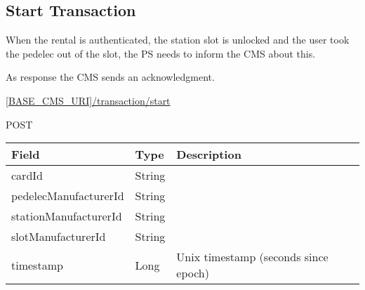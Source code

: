 %
%
%
%
%
%
%
%
%


\subsection{Start Transaction}

When the rental is authenticated, the station slot is unlocked and the user took the pedelec out of the slot, the \acs{PS} needs to inform the \acs{CMS} about this.

As response the \acs{CMS} sends an acknowledgment.

 \url{[BASE_CMS_URI]/transaction/start}

 POST

\begin{table}[!h]
\vspace{-7mm}
\begin{tabularx}{\linewidth}{ | l | l | X | }
  \hline
  \rowcolor{table-head}
  Field & Type & Description \\
  \hline
  	cardId & String 		& \\
  	pedelecManufacturerId & String			& \\
  	stationManufacturerId & String			& \\
  	slotManufacturerId & String			& \\
  	timestamp & Long					& Unix timestamp (seconds since epoch) \\
    \hline
\end{tabularx}
\end{table}

